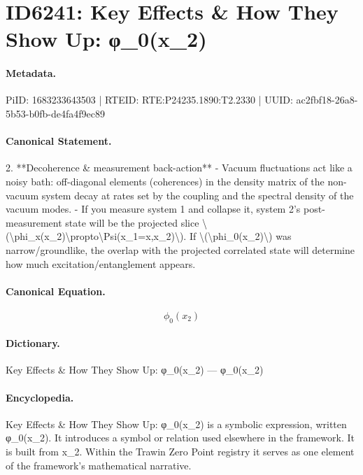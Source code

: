 \section*{ID6241: Key Effects \& How They Show Up: φ\_0(x\_2)}
\paragraph{Metadata.}
PiID: 1683233643503 | RTEID: RTE:P24235.1890:T2.2330 | UUID: ac2fbf18-26a8-5b53-b0fb-de4fa4f9ec89

\paragraph{Canonical Statement.}
2. **Decoherence \& measurement back-action** - Vacuum fluctuations act like a noisy bath: off-diagonal elements (coherences) in the density matrix of the non-vacuum system decay at rates set by the coupling and the spectral density of the vacuum modes. - If you measure system 1 and collapse it, system 2’s post-measurement state will be the projected slice \textbackslash{}(\textbackslash{}phi\_x(x\_2)\textbackslash{}propto\textbackslash{}Psi(x\_1=x,x\_2)\textbackslash{}). If \textbackslash{}(\textbackslash{}phi\_0(x\_2)\textbackslash{}) was narrow/groundlike, the overlap with the projected correlated state will determine how much excitation/entanglement appears.

\paragraph{Canonical Equation.}
\[
\phi_0(x_2)
\]

\paragraph{Dictionary.}
Key Effects \& How They Show Up: φ\_0(x\_2) — φ\_0(x\_2)

\paragraph{Encyclopedia.}
Key Effects \& How They Show Up: φ\_0(x\_2) is a symbolic expression, written φ\_0(x\_2). It introduces a symbol or relation used elsewhere in the framework. It is built from x\_2. Within the Trawin Zero Point registry it serves as one element of the framework's mathematical narrative.
